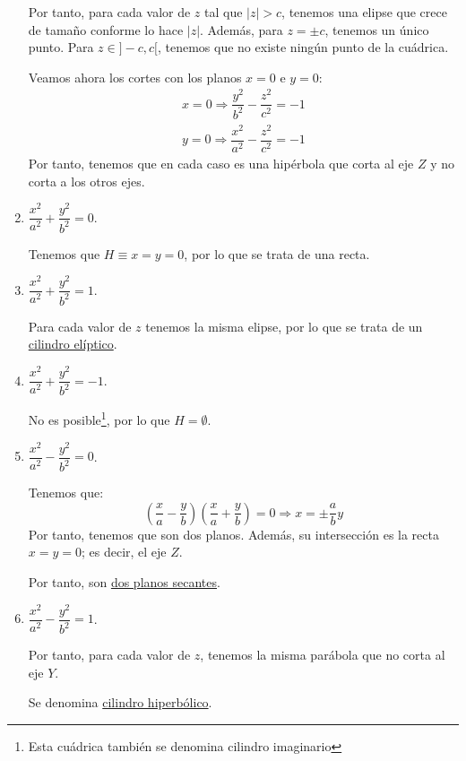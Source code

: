 \begin{enumerate}
    Por tanto, para cada valor de $z$ tal que $|z|>c$, tenemos una elipse que crece de tamaño conforme lo hace $|z|$. Además, para $z=\pm c$, tenemos un único punto. Para $z\in ]-c,c[$, tenemos que no existe ningún punto de la cuádrica.

    Veamos ahora los cortes con los planos $x=0$ e $y=0$:
    \begin{gather*}
        x = 0 \Longrightarrow \dfrac{y^2}{b^2} - \dfrac{z^2}{c^2} = -1 \\
        y = 0 \Longrightarrow \dfrac{x^2}{a^2} - \dfrac{z^2}{c^2} = -1
    \end{gather*}
    Por tanto, tenemos que en cada caso es una hipérbola que corta al eje $Z$ y no corta a los otros ejes.

    
    \item $\dfrac{x^2}{a^2} + \dfrac{y^2}{b^2} = 0$.

    Tenemos que $H\equiv x=y=0$, por lo que se trata de una recta.
    
    \item $\dfrac{x^2}{a^2} + \dfrac{y^2}{b^2} = 1$.

    Para cada valor de $z$ tenemos la misma elipse, por lo que se trata de un \ul{cilindro elíptico}.
    
    \item $\dfrac{x^2}{a^2} + \dfrac{y^2}{b^2} = -1$.

    No es posible\footnote{Esta cuádrica también se denomina cilindro imaginario}, por lo que $H=\emptyset$.
    
    \item $\dfrac{x^2}{a^2} - \dfrac{y^2}{b^2} = 0$.

    Tenemos que:
    \begin{equation*}
        \left(\dfrac{x}{a} - \dfrac{y}{b}\right)\left(\dfrac{x}{a} + \dfrac{y}{b}\right) = 0 \Longrightarrow x = \pm \frac{a}{b}y
    \end{equation*}
    Por tanto, tenemos que son dos planos. Además, su intersección es la recta $x=y=0$; es decir, el eje $Z$.

    Por tanto, son \ul{dos planos secantes}.

    
    \item $\dfrac{x^2}{a^2} - \dfrac{y^2}{b^2} = 1$.

    Por tanto, para cada valor de $z$, tenemos la misma parábola que no corta al eje $Y$.

    Se denomina \ul{cilindro hiperbólico}.
    

\end{enumerate}
